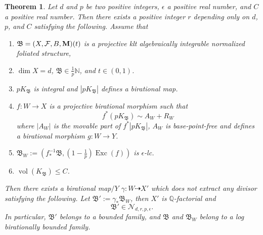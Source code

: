 \documentclass[11pt,reqno]{amsart}
\numberwithin{equation}{section}
\newcommand{\Mm}{{\bf{M}}}
\newcommand{\vol}{\operatorname{vol}}
\newcommand{\Exc}{\operatorname{Exc}}
\newcommand{\Bb}{{\mathfrak{B}}}
\newcommand{\Ff}{\mathcal{F}}
\newtheorem{thm}{Theorem}[section]
\theoremstyle{definition}
\begin{document}
\begin{thm}\label{thm: precise birational boundedness}
    Let $d$ and $p$ be two positive integers, $\epsilon$ a positive real number, and $C$ a positive real number. Then there exists a positive integer $r$ depending only on $d$, $p$, and $C$ satisfying the following. Assume that
    \begin{enumerate}
        \item $\Bb=(X,\Ff,B,\Mm)(t)$ is a projective klt algebraically integrable normalized foliated structure,
        \item $\dim X=d$, $\Bb\in\frac{1}{p}\mathbb N$, and $t\in (0,1)$.
        \item $pK_{\Bb}$ is integral and $|pK_{\Bb}|$ defines a birational map.
        \item $f: W\rightarrow X$ is a projective birational morphism such that
        $$f^*(pK_{\Bb})\sim A_W+R_W$$
        where $|A_W|$ is the movable part of $f^*|pK_{\Bb}|$, $A_W$ is base-point-free and defines a birational morphism $g: W\rightarrow Y$.
        \item $\Bb_W:=\left(f^{-1}_*\Bb,\left(1-\frac{1}{p}\right)\Exc(f)\right)$ is $\epsilon$-lc.
        \item $\vol(K_{\Bb})\leq C$.
    \end{enumerate}
Then there exists a birational map$/Y$ $\gamma: W\dashrightarrow X'$ which does not extract any divisor satisfying the following. Let $\Bb':=\gamma_*\Bb_W$, then $X'$ is $\mathbb Q$-factorial and
$$\Bb'\in \mathcal{N}_{d,r,p,\epsilon}.$$
In particular, $\Bb'$ belongs to a bounded family, and $\Bb$ and $\Bb_W$ belong to a log birationally bounded family.
\end{thm}
\end{document}
